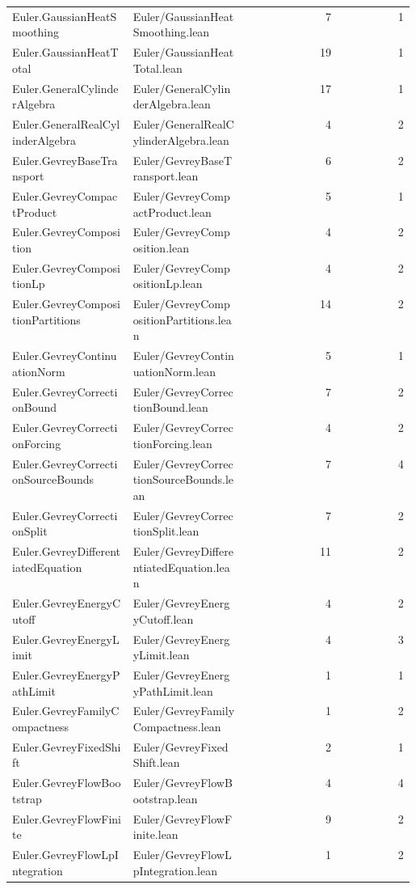 \begin{longtable}{p{0.30\linewidth}p{0.28\linewidth}rr}
Euler.GaussianHeatSmoothing & Euler/GaussianHeatSmoothing.lean & 7 & 1\\
Euler.GaussianHeatTotal & Euler/GaussianHeatTotal.lean & 19 & 1\\
Euler.GeneralCylinderAlgebra & Euler/GeneralCylinderAlgebra.lean & 17 & 1\\
Euler.GeneralRealCylinderAlgebra & Euler/GeneralRealCylinderAlgebra.lean & 4 & 2\\
Euler.GevreyBaseTransport & Euler/GevreyBaseTransport.lean & 6 & 2\\
Euler.GevreyCompactProduct & Euler/GevreyCompactProduct.lean & 5 & 1\\
Euler.GevreyComposition & Euler/GevreyComposition.lean & 4 & 2\\
Euler.GevreyCompositionLp & Euler/GevreyCompositionLp.lean & 4 & 2\\
Euler.GevreyCompositionPartitions & Euler/GevreyCompositionPartitions.lean & 14 & 2\\
Euler.GevreyContinuationNorm & Euler/GevreyContinuationNorm.lean & 5 & 1\\
Euler.GevreyCorrectionBound & Euler/GevreyCorrectionBound.lean & 7 & 2\\
Euler.GevreyCorrectionForcing & Euler/GevreyCorrectionForcing.lean & 4 & 2\\
Euler.GevreyCorrectionSourceBounds & Euler/GevreyCorrectionSourceBounds.lean & 7 & 4\\
Euler.GevreyCorrectionSplit & Euler/GevreyCorrectionSplit.lean & 7 & 2\\
Euler.GevreyDifferentiatedEquation & Euler/GevreyDifferentiatedEquation.lean & 11 & 2\\
Euler.GevreyEnergyCutoff & Euler/GevreyEnergyCutoff.lean & 4 & 2\\
Euler.GevreyEnergyLimit & Euler/GevreyEnergyLimit.lean & 4 & 3\\
Euler.GevreyEnergyPathLimit & Euler/GevreyEnergyPathLimit.lean & 1 & 1\\
Euler.GevreyFamilyCompactness & Euler/GevreyFamilyCompactness.lean & 1 & 2\\
Euler.GevreyFixedShift & Euler/GevreyFixedShift.lean & 2 & 1\\
Euler.GevreyFlowBootstrap & Euler/GevreyFlowBootstrap.lean & 4 & 4\\
Euler.GevreyFlowFinite & Euler/GevreyFlowFinite.lean & 9 & 2\\
Euler.GevreyFlowLpIntegration & Euler/GevreyFlowLpIntegration.lean & 1 & 2\\

\end{longtable}
